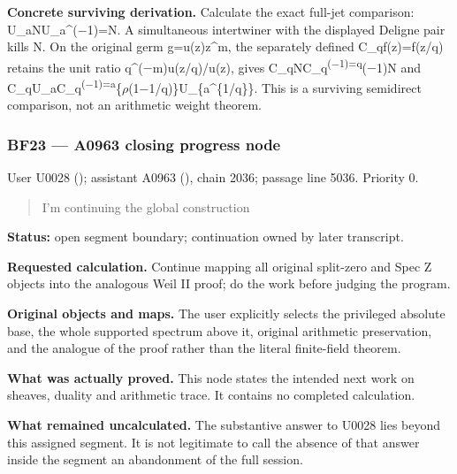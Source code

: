 \documentclass[10pt,a4paper,oneside]{report}
\begin{document}
\textbf{Concrete surviving derivation.} Calculate the exact full-jet
comparison:
U\_aNU\_a\textasciicircum{}(\allowbreak{}\ensuremath{−}\allowbreak{}1)=N.
A simultaneous intertwiner with the displayed Deligne pair kills N. On
the original germ g=u(z)z\^{}m, the separately defined C\_qf(z)=f(z/q)
retains the unit ratio
q\textasciicircum{}(\allowbreak{}\ensuremath{−}\allowbreak{}m)u(z/q)/u(z),
gives
C\_qNC\_q\textsuperscript{(\allowbreak{}\ensuremath{−}\allowbreak{}1)=q}(\allowbreak{}\ensuremath{−}\allowbreak{}1)N
and
C\_qU\_aC\_q\textsuperscript{(\allowbreak{}\ensuremath{−}\allowbreak{}1)=a}\{\allowbreak{}\ensuremath{ρ}\allowbreak{}(1\allowbreak{}\ensuremath{−}\allowbreak{}1/q)\}U\_\{a\textasciicircum{}\{1/q\}\}.
This is a surviving semidirect comparison, not an arithmetic weight
theorem.

\subsubsection{BF23 --- A0963 closing progress
node}\label{bf23-a0963-closing-progress-node}

User U0028 (\protect{});
assistant A0963 (\protect{}),
chain 2036; passage line 5036. Priority 0.

\begin{quote}
I'm continuing the global construction
\end{quote}

\textbf{Status:} open segment boundary; continuation owned by later
transcript.

\textbf{Requested calculation.} Continue mapping all original split-zero
and Spec Z objects into the analogous Weil II proof; do the work before
judging the program.

\textbf{Original objects and maps.} The user explicitly selects the
privileged absolute base, the whole supported spectrum above it,
original arithmetic preservation, and the analogue of the proof rather
than the literal finite-field theorem.

\textbf{What was actually proved.} This node states the intended next
work on sheaves, duality and arithmetic trace. It contains no completed
calculation.

\textbf{What remained uncalculated.} The substantive answer to U0028
lies beyond this assigned segment. It is not legitimate to call the
absence of that answer inside the segment an abandonment of the full
session.
\end{document}
